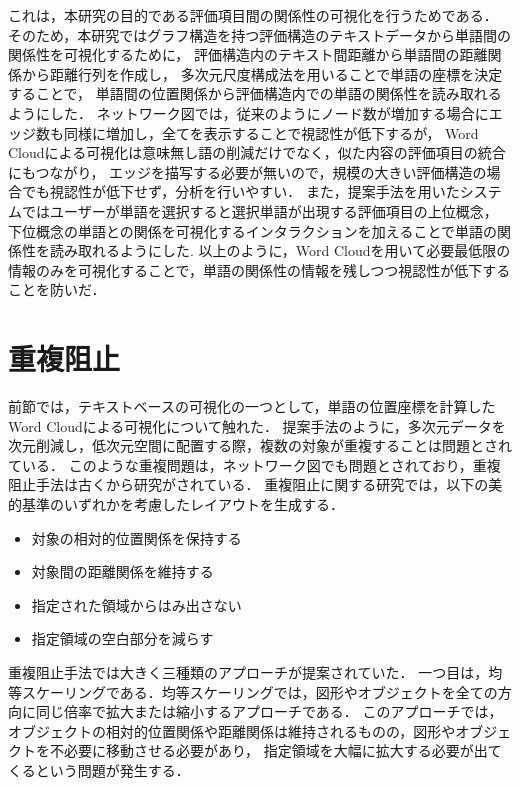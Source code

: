 \documentclass[syuuron]{kuee}
\begin{document}
		これは，本研究の目的である評価項目間の関係性の可視化を行うためである．
		そのため，本研究ではグラフ構造を持つ評価構造のテキストデータから単語間の関係性を可視化するために，
		評価構造内のテキスト間距離から単語間の距離関係から距離行列を作成し，
		多次元尺度構成法を用いることで単語の座標を決定することで，
		単語間の位置関係から評価構造内での単語の関係性を読み取れるようにした．
		ネットワーク図では，従来のようにノード数が増加する場合にエッジ数も同様に増加し，全てを表示することで視認性が低下するが，
		Word Cloudによる可視化は意味無し語の削減だけでなく，似た内容の評価項目の統合にもつながり，
		エッジを描写する必要が無いので，規模の大きい評価構造の場合でも視認性が低下せず，分析を行いやすい．
		また，提案手法を用いたシステムではユーザーが単語を選択すると選択単語が出現する評価項目の上位概念，
		下位概念の単語との関係を可視化するインタラクションを加えることで単語の関係性を読み取れるようにした.
		以上のように，Word Cloudを用いて必要最低限の情報のみを可視化することで，単語の関係性の情報を残しつつ視認性が低下することを防いだ．
		
	\section{重複阻止}
		前節では，テキストベースの可視化の一つとして，単語の位置座標を計算したWord Cloudによる可視化について触れた．
		提案手法のように，多次元データを次元削減し，低次元空間に配置する際，複数の対象が重複することは問題とされている．
		このような重複問題は，ネットワーク図でも問題とされており，重複阻止手法は古くから研究がされている．
		重複阻止に関する研究では，以下の美的基準のいずれかを考慮したレイアウトを生成する．
		\begin{itemize}
			\item 対象の相対的位置関係を保持する
			\item 対象間の距離関係を維持する
			\item 指定された領域からはみ出さない
			\item 指定領域の空白部分を減らす
		\end{itemize}
		
		重複阻止手法では大きく三種類のアプローチが提案されていた．
		一つ目は，均等スケーリングである．均等スケーリングでは，図形やオブジェクトを全ての方向に同じ倍率で拡大または縮小するアプローチである\cite{fsa1}．
		このアプローチでは，オブジェクトの相対的位置関係や距離関係は維持されるものの，図形やオブジェクトを不必要に移動させる必要があり，
		指定領域を大幅に拡大する必要が出てくるという問題が発生する．
		
\end{document}
